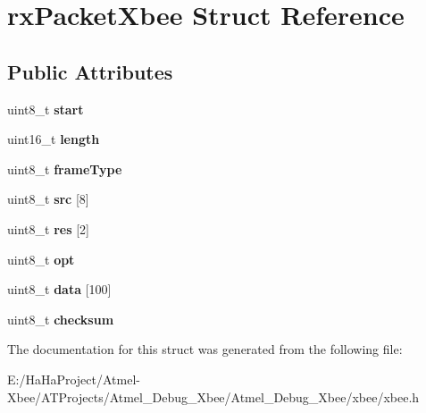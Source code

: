 \hypertarget{structrx_packet_xbee}{}\section{rx\+Packet\+Xbee Struct Reference}
\label{structrx_packet_xbee}
\subsection*{Public Attributes}
\begin{DoxyCompactItemize}
\item 
\mbox{\label{structrx_packet_xbee_a377a19daba468a5e9cbde7d7b23f9adc}} 
uint8\+\_\+t {\bfseries start}
\item 
\mbox{\label{structrx_packet_xbee_a601c35f300d3e91408cbe876d3e97e2e}} 
uint16\+\_\+t {\bfseries length}
\item 
\mbox{\label{structrx_packet_xbee_ad14bacbde0d4d8c92c25a05a7740c10e}} 
uint8\+\_\+t {\bfseries frame\+Type}
\item 
\mbox{\label{structrx_packet_xbee_a0c55be212541a949bdf236818a91c95f}} 
uint8\+\_\+t {\bfseries src} \mbox{[}8\mbox{]}
\item 
\mbox{\label{structrx_packet_xbee_a8b254defb50d675f1557a96694bb903b}} 
uint8\+\_\+t {\bfseries res} \mbox{[}2\mbox{]}
\item 
\mbox{\label{structrx_packet_xbee_afd1990ee2a47a83af72df2c86c9ae212}} 
uint8\+\_\+t {\bfseries opt}
\item 
\mbox{\label{structrx_packet_xbee_aa0bf7a5413df364343de336354b9d678}} 
uint8\+\_\+t {\bfseries data} \mbox{[}100\mbox{]}
\item 
\mbox{\label{structrx_packet_xbee_a9d0e64c72812b98e53f1df952070478b}} 
uint8\+\_\+t {\bfseries checksum}
\end{DoxyCompactItemize}


The documentation for this struct was generated from the following file\+:\begin{DoxyCompactItemize}
\item 
E\+:/\+Ha\+Ha\+Project/\+Atmel-\/\+Xbee/\+A\+T\+Projects/\+Atmel\+\_\+\+Debug\+\_\+\+Xbee/\+Atmel\+\_\+\+Debug\+\_\+\+Xbee/xbee/xbee.\+h\end{DoxyCompactItemize}

